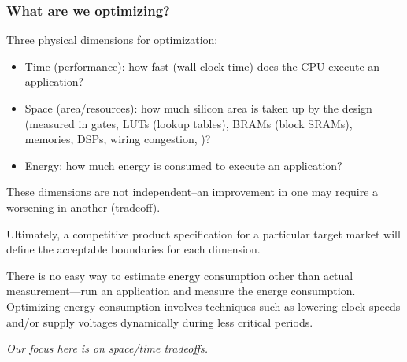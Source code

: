 \begin{frame}[fragile]
\frametitle{What are we optimizing?}

\footnotesize

Three physical dimensions for optimization:

\vxx

\begin{itemize}

  \item Time (performance): how fast (wall-clock time) does the CPU execute an application?

  \vx

  \item Space (area/resources): how much silicon area is taken up by the design
      (measured in gates, LUTs
      (lookup tables), BRAMs (block SRAMs), memories, DSPs, wiring
      congestion, {\etc})?

  \vx

  \item Energy: how much energy is consumed to execute an application?

\end{itemize}

\vxx

These dimensions are not independent--an improvement in one may
require a worsening in another (tradeoff).

\vx

Ultimately, a competitive product specification for a particular target
market will define the acceptable boundaries for each dimension.

\vx

There is no easy way to estimate energy consumption other than actual
measurement---run an application and measure the energe consumption.
Optimizing energy consumption involves techniques such as lowering
clock speeds and/or supply voltages dynamically during less critical
periods.

\vx

\begin{center}\large
\emph{Our focus here is on space/time tradeoffs.}
\end{center}

\end{frame}


